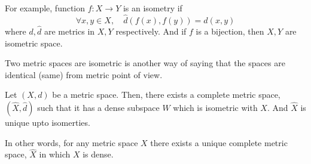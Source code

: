 For example, function $f : X \to Y$ is an isometry if
$$ \forall x,y \in X,\quad \hat{d}(f(x),f(y)) = d(x,y)$$
where $d, \hat{d}$ are metrics in $X,Y$ respectively.
And if  $f$ is a bijection, then $X,Y$ are isometric space.\\

\begin{commentary}
	Two metric spaces are isometric is another way of saying that the spaces are identical (same) from metric point of view.
\end{commentary}

\begin{theorem}[completion]
	Let $(X,d)$ be a metric space.
	Then, there exists a complete metric space, $(\hat{X},\hat{d})$ such that it has a dense subspace $W$ which is isometric with $X$.
	And $\hat{X}$ is unique upto isomerties.
\end{theorem}
\begin{commentary}
	In other words, for any metric space $X$ there exists a unique complete metric space, $\hat{X}$ in which $X$ is dense.
\end{commentary}
